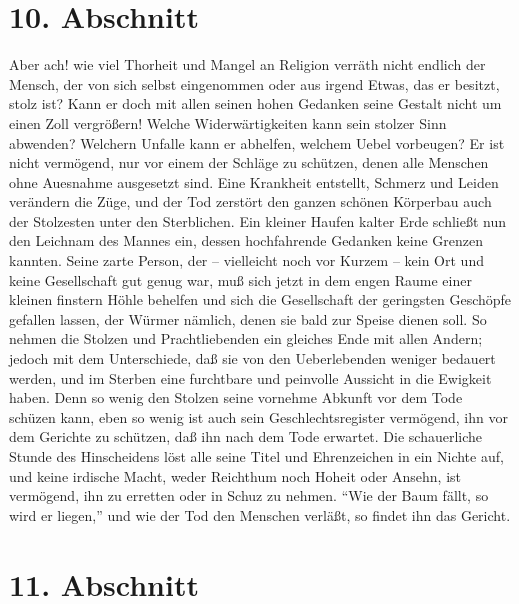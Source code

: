 \section{10. Abschnitt} \label{kap12_ab10}

Aber ach! wie viel Thorheit und Mangel an Religion verräth nicht endlich der
Mensch, der von sich selbst eingenommen oder aus irgend Etwas, das er besitzt,
stolz ist? Kann er doch mit allen seinen hohen Gedanken seine Gestalt nicht um
einen Zoll vergrößern! Welche Widerwärtigkeiten kann sein stolzer Sinn abwenden?
Welchern Unfalle kann er abhelfen, welchem Uebel vorbeugen? Er ist nicht
vermögend, nur vor einem der Schläge zu schützen, denen alle Menschen ohne
Auesnahme ausgesetzt sind. Eine Krankheit entstellt, Schmerz und Leiden
verändern die Züge, und der Tod zerstört den ganzen schönen Körperbau auch der
Stolzesten unter den Sterblichen. Ein kleiner Haufen kalter Erde schließt nun
den Leichnam des Mannes ein, dessen hochfahrende Gedanken keine Grenzen kannten.
Seine zarte Person, der -- vielleicht noch vor Kurzem -- kein Ort und keine
Gesellschaft gut genug war, muß sich jetzt in dem engen Raume einer kleinen
finstern Höhle behelfen und sich die Gesellschaft der geringsten Geschöpfe
gefallen lassen, der Würmer nämlich, denen sie bald zur Speise dienen soll. So
nehmen die Stolzen und Prachtliebenden ein gleiches Ende mit allen Andern;
jedoch mit dem Unterschiede, daß sie von den Ueberlebenden weniger bedauert
werden, und im Sterben eine furchtbare und peinvolle Aussicht in die Ewigkeit
haben. Denn so wenig den Stolzen seine vornehme Abkunft vor dem Tode schüzen
kann, eben so wenig ist auch sein Geschlechtsregister vermögend, ihn vor dem
Gerichte zu schützen, daß ihn nach dem Tode erwartet. Die schauerliche Stunde
des Hinscheidens löst alle seine Titel und Ehrenzeichen in ein Nichte auf, und
keine irdische Macht, weder Reichthum noch Hoheit oder Ansehn, ist vermögend,
ihn zu erretten oder in Schuz zu nehmen. "`Wie der Baum fällt, so wird er
liegen,"' und wie der Tod den Menschen verläßt, so findet ihn das Gericht.

\section{11. Abschnitt} \label{kap12_ab11}

